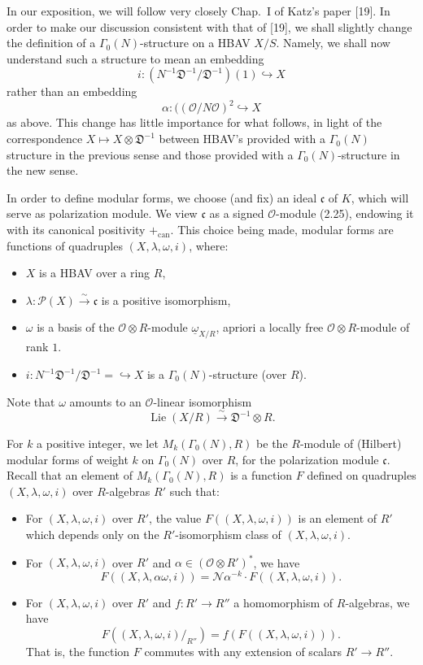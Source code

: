 \documentclass[12pt,a4paper]{article}
\theoremstyle{plain}
\theoremstyle{definition}
\theoremstyle{remark}
\DeclareMathOperator{\Lie}{Lie}
\begin{document}
In our exposition, we will follow very closely Chap.~I of Katz's paper [19]. In order to make our discussion consistent with that of [19], we shall slightly change the definition of a $\Gamma_0(N)$-structure on a HBAV $X/S$. Namely, we shall now understand such a structure to mean an embedding
\[
i: (N^{-1}\mathfrak{D}^{-1}/\mathfrak{D}^{-1})(1) \hookrightarrow X
\]
rather than an embedding
\[
\alpha: ((\mathcal{O}/N\mathcal{O})^2 \hookrightarrow X
\]
as above. This change has little importance for what follows, in light of the correspondence $X \mapsto X \otimes \mathfrak{D}^{-1}$ between HBAV's provided with a $\Gamma_0(N)$ structure in the previous sense and those provided with a $\Gamma_0(N)$-structure in the new sense.

In order to define modular forms, we choose (and fix) an ideal $\mathfrak{c}$ of $K$, which will serve as polarization module. We view $\mathfrak{c}$ as a signed $\mathcal{O}$-module (2.25), endowing it with its canonical positivity $+_{\mathrm{can}}$. This choice being made, modular forms are functions of quadruples $(X, \lambda, \omega, i)$, where:
\begin{itemize}
\item $X$ is a HBAV over a ring $R$,
\item $\lambda: \mathscr{P}(X) \xrightarrow{\sim} \mathfrak{c}$ is a positive isomorphism,
\item $\omega$ is a basis of the $\mathcal{O} \otimes R$-module $\underline{\omega}_{X/R}$, apriori a locally free $\mathcal{O} \otimes R$-module of rank $1$.
\item $i: N^{-1}\mathfrak{D}^{-1}/\mathfrak{D}^{-1} = \hookrightarrow X$ is a $\Gamma_0(N)$-structure (over $R$).
\end{itemize}
Note that $\omega$ amounts to an $\mathcal{O}$-linear isomorphism
\begin{equation}\label{eq:5.1}
\Lie(X/R) \xrightarrow{\sim} \mathfrak{D}^{-1} \otimes R.
\end{equation}

For $k$ a positive integer, we let $M_k(\Gamma_0(N), R)$ be the $R$-module of (Hilbert) modular forms of weight $k$ on $\Gamma_0(N)$ over $R$, for the polarization module $\mathfrak{c}$. Recall that an element of $M_k(\Gamma_0(N), R)$ is a function $F$ defined on quadruples $(X, \lambda, \omega, i)$ over $R$-algebras $R'$ such that:
\begin{itemize}
\item For $(X, \lambda, \omega, i)$ over $R'$, the value $F((X, \lambda, \omega, i))$ is an element of $R'$ which depends only on the $R'$-isomorphism class of $(X, \lambda, \omega, i)$.
\item For $(X, \lambda, \omega, i)$ over $R'$ and $\alpha \in (\mathcal{O} \otimes R')^*$, we have
\[
F((X, \lambda, \alpha\omega, i)) = \mathcal{N}\alpha^{-k} \cdot F((X, \lambda, \omega, i)).
\]
\item For $(X, \lambda, \omega, i)$ over $R'$ and $f: R' \to R''$ a homomorphism of $R$-algebras, we have
\[
F((X, \lambda, \omega, i)/_{R''}) = f(F((X, \lambda, \omega, i))).
\]
That is, the function $F$ commutes with any extension of scalars $R' \to R''$.
\end{itemize}
\end{document}
